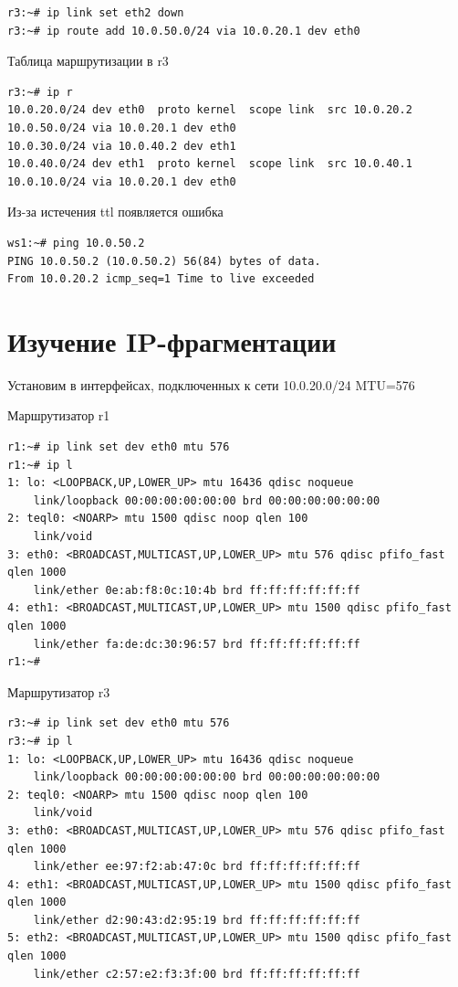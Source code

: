 \documentclass[a4paper,12pt]{article}
\begin{document}
\begin{Verbatim}
r3:~# ip link set eth2 down
r3:~# ip route add 10.0.50.0/24 via 10.0.20.1 dev eth0
\end{Verbatim}

Таблица маршрутизации в r3

\begin{Verbatim}
r3:~# ip r
10.0.20.0/24 dev eth0  proto kernel  scope link  src 10.0.20.2 
10.0.50.0/24 via 10.0.20.1 dev eth0 
10.0.30.0/24 via 10.0.40.2 dev eth1 
10.0.40.0/24 dev eth1  proto kernel  scope link  src 10.0.40.1 
10.0.10.0/24 via 10.0.20.1 dev eth0 
\end{Verbatim}

Из-за истечения ttl появляется ошибка

\begin{Verbatim}
ws1:~# ping 10.0.50.2
PING 10.0.50.2 (10.0.50.2) 56(84) bytes of data.
From 10.0.20.2 icmp_seq=1 Time to live exceeded
\end{Verbatim}

\section{Изучение IP-фрагментации}

Установим в интерфейсах, подключенных к сети 10.0.20.0/24 MTU=576

Маршрутизатор r1
\begin{Verbatim}
r1:~# ip link set dev eth0 mtu 576
r1:~# ip l
1: lo: <LOOPBACK,UP,LOWER_UP> mtu 16436 qdisc noqueue 
    link/loopback 00:00:00:00:00:00 brd 00:00:00:00:00:00
2: teql0: <NOARP> mtu 1500 qdisc noop qlen 100
    link/void 
3: eth0: <BROADCAST,MULTICAST,UP,LOWER_UP> mtu 576 qdisc pfifo_fast qlen 1000
    link/ether 0e:ab:f8:0c:10:4b brd ff:ff:ff:ff:ff:ff
4: eth1: <BROADCAST,MULTICAST,UP,LOWER_UP> mtu 1500 qdisc pfifo_fast qlen 1000
    link/ether fa:de:dc:30:96:57 brd ff:ff:ff:ff:ff:ff
r1:~# 
\end{Verbatim}

Маршрутизатор r3
\begin{Verbatim}
r3:~# ip link set dev eth0 mtu 576
r3:~# ip l
1: lo: <LOOPBACK,UP,LOWER_UP> mtu 16436 qdisc noqueue 
    link/loopback 00:00:00:00:00:00 brd 00:00:00:00:00:00
2: teql0: <NOARP> mtu 1500 qdisc noop qlen 100
    link/void 
3: eth0: <BROADCAST,MULTICAST,UP,LOWER_UP> mtu 576 qdisc pfifo_fast qlen 1000
    link/ether ee:97:f2:ab:47:0c brd ff:ff:ff:ff:ff:ff
4: eth1: <BROADCAST,MULTICAST,UP,LOWER_UP> mtu 1500 qdisc pfifo_fast qlen 1000
    link/ether d2:90:43:d2:95:19 brd ff:ff:ff:ff:ff:ff
5: eth2: <BROADCAST,MULTICAST,UP,LOWER_UP> mtu 1500 qdisc pfifo_fast qlen 1000
    link/ether c2:57:e2:f3:3f:00 brd ff:ff:ff:ff:ff:ff
\end{Verbatim}
\end{document}
